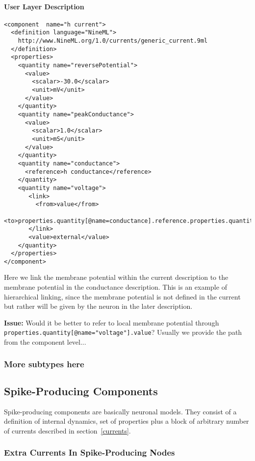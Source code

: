 \documentclass{article}
\newcommand{\issue}[1]{%
\begin{center}
\colorbox{issuecolor}{\parbox{0.8\linewidth}{\textbf{Issue:} #1}}
\end{center}%
}
\begin{document}
\paragraph{User Layer Description}
\begin{verbatim}
<component  name="h current">
  <definition language="NineML">
    http://www.NineML.org/1.0/currents/generic_current.9ml
  </definition>
  <properties>
    <quantity name="reversePotential">
      <value>
        <scalar>-30.0</scalar>
        <unit>mV</unit>
      </value>
    </quantity>
    <quantity name="peakConductance">
      <value>
        <scalar>1.0</scalar>
        <unit>mS</unit>
      </value>
    </quantity>
    <quantity name="conductance">
      <reference>h conductance</reference>
    </quantity>
    <quantity name="voltage">
       <link>
         <from>value</from>
         <to>properties.quantity[@name=conductance].reference.properties.quantity[@name="voltage"].value</to>
       </link>
       <value>external</value>
    </quantity>
  </properties>
</component>
\end{verbatim}
Here we link the membrane potential within the current description to the membrane
potential in the conductance description. This is an example of hierarchical linking,
since the membrane potential is not defined in the current but rather will be given
by the neuron in the later description.

\issue{Would it be better to refer to local membrane potential through
{\tt properties.quantity[@name="voltage"].value}? Usually we provide the path from
the component level...}

\subsubsection{More subtypes here}

\subsection{Spike-Producing Components}

Spike-producing components are basically neuronal models. They consist of
a definition of internal dynamics, set of properties plus a block of arbitrary
number of currents described in section~\ref{currents}.

\subsubsection{Extra Currents In Spike-Producing Nodes}
\end{document}
